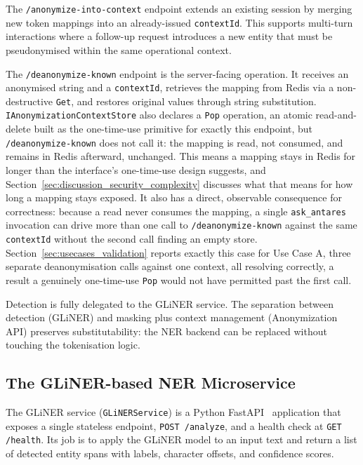 The \texttt{/anonymize-into-context} endpoint extends an existing session by merging new token mappings into an already-issued \texttt{contextId}. This supports multi-turn interactions where a follow-up request introduces a new entity that must be pseudonymised within the same operational context.

The \texttt{/deanonymize-known} endpoint is the server-facing operation. It receives an anonymised string and a \texttt{contextId}, retrieves the mapping from Redis via a non-destructive \texttt{Get}, and restores original values through string substitution. \texttt{IAnonymizationContextStore} also declares a \texttt{Pop} operation, an atomic read-and-delete built as the one-time-use primitive for exactly this endpoint, but \texttt{/deanonymize-known} does not call it: the mapping is read, not consumed, and remains in Redis afterward, unchanged. This means a mapping stays in Redis for longer than the interface's one-time-use design suggests, and Section~\ref{sec:discussion_security_complexity} discusses what that means for how long a mapping stays exposed. It also has a direct, observable consequence for correctness: because a read never consumes the mapping, a single \texttt{ask\_antares} invocation can drive more than one call to \texttt{/deanonymize-known} against the same \texttt{contextId} without the second call finding an empty store. Section~\ref{sec:usecases_validation} reports exactly this case for Use Case A, three separate deanonymisation calls against one context, all resolving correctly, a result a genuinely one-time-use \texttt{Pop} would not have permitted past the first call.

Detection is fully delegated to the GLiNER service. The separation between detection (GLiNER) and masking plus context management (Anonymization API) preserves substitutability: the NER backend can be replaced without touching the tokenisation logic.

\subsection{The GLiNER-based NER Microservice}
\label{subsec:arch_gliner_ner}

The GLiNER service (\texttt{GLiNERService}) is a Python FastAPI~\cite{fastapi2018} application that exposes a single stateless endpoint, \texttt{POST /analyze}, and a health check at \texttt{GET /health}. Its job is to apply the GLiNER model to an input text and return a list of detected entity spans with labels, character offsets, and confidence scores.

